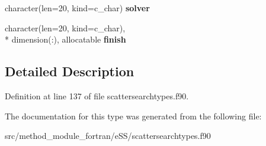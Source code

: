 \begin{DoxyCompactItemize}
\item 
\hypertarget{structscattersearchtypes_1_1loptions_a237b1cc59424e95e661732556e6d08f1}{character(len=20, kind=c\-\_\-char) {\bfseries solver}}\label{structscattersearchtypes_1_1loptions_a237b1cc59424e95e661732556e6d08f1}

\item 
\hypertarget{structscattersearchtypes_1_1loptions_a2e603893668387dee44e3177e96c3d28}{character(len=20, kind=c\-\_\-char), \\*
dimension(\-:), allocatable {\bfseries finish}}\label{structscattersearchtypes_1_1loptions_a2e603893668387dee44e3177e96c3d28}

\end{DoxyCompactItemize}


\subsection{Detailed Description}


Definition at line 137 of file scattersearchtypes.\-f90.



The documentation for this type was generated from the following file\-:\begin{DoxyCompactItemize}
\item 
src/method\-\_\-module\-\_\-fortran/e\-S\-S/scattersearchtypes.\-f90\end{DoxyCompactItemize}
